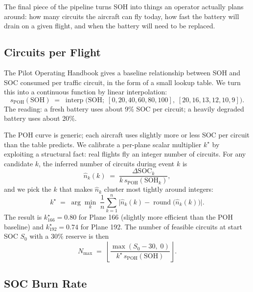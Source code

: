 \documentclass[11pt]{article}
\begin{document}
The final piece of the pipeline turns SOH into things an operator
actually plans around: how many circuits the aircraft can fly today,
how fast the battery will drain on a given flight, and when the
battery will need to be replaced.

\subsection{Circuits per Flight}

The Pilot Operating Handbook gives a baseline relationship between SOH
and SOC consumed per traffic circuit, in the form of a small lookup
table. We turn this into a continuous function by linear interpolation:
\begin{equation}
s_{\mathrm{POH}}(\mathrm{SOH}) \;=\; \operatorname{interp}\!\big(\mathrm{SOH};\; [0, 20, 40, 60, 80, 100],\; [20, 16, 13, 12, 10, 9]\big).
\end{equation}
The reading: a fresh battery uses about 9\% SOC per circuit; a heavily
degraded battery uses about 20\%.

The POH curve is generic; each aircraft uses slightly more or less SOC
per circuit than the table predicts. We calibrate a per-plane scalar
multiplier \(k^{\star}\) by exploiting a structural fact: real flights
fly an integer number of circuits. For any candidate \(k\), the
inferred number of circuits during event \(k\) is
\begin{equation}
\widehat{n}_k(k) \;=\; \frac{\Delta\mathrm{SOC}_k}{k\,s_{\mathrm{POH}}(\mathrm{SOH}_k)},
\end{equation}
and we pick the \(k\) that makes \(\widehat{n}_k\) cluster most tightly
around integers:
\begin{equation}
k^{\star} \;=\; \arg\min_{k}\;\frac{1}{n}\sum_{k=1}^{n}\Big|\widehat{n}_k(k) - \operatorname{round}\!\big(\widehat{n}_k(k)\big)\Big|.
\end{equation}
The result is \(k^{\star}_{166} = 0.80\) for Plane 166 (slightly more
efficient than the POH baseline) and \(k^{\star}_{192} = 0.74\) for
Plane 192. The number of feasible circuits at start SOC \(S_0\) with a
30\% reserve is then
\begin{equation}
N_{\max} \;=\; \left\lfloor \frac{\max(S_0 - 30,\; 0)}{k^{\star}\,s_{\mathrm{POH}}(\mathrm{SOH})} \right\rfloor.
\end{equation}

\subsection{SOC Burn Rate}
\end{document}
